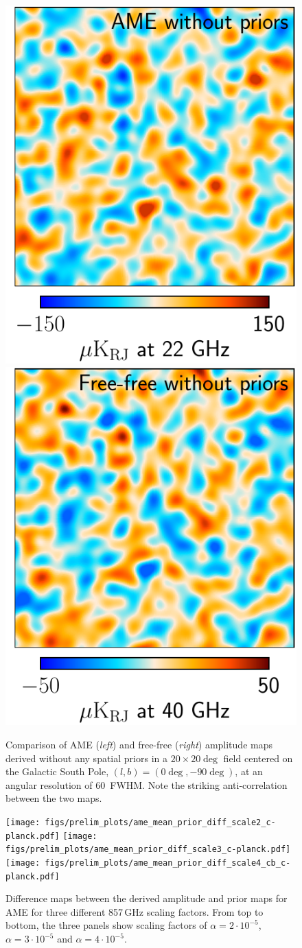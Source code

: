 \documentclass[twocolumn]{aa}
\begin{document}
\begin{figure}
  \center
  \includegraphics[width=0.49\linewidth]{figs/ame_BP8_priorfree_60arcmin_r150_lon0_lat-90_20x20deg_fs18.pdf}
  \includegraphics[width=0.49\linewidth]{figs/ff_BP8_priorfree_60arcmin_r50_lon0_lat-90_20x20deg_fs18.pdf}
  \caption{Comparison of AME (\emph{left}) and free-free
    (\emph{right}) amplitude maps derived without any spatial priors
    in a $20\times20\deg$ field centered on the Galactic South Pole,
    $(l,b)=(0\deg,-90\deg)$, at an angular resolution of
    60\arcm\ FWHM. Note the striking anti-correlation between the two maps.}
  \label{fig:amp_priors_gnom_60arcmin}
\end{figure}


\begin{figure}
  \center
  \texttt{[image: figs/prelim\_plots/ame\_mean\_prior\_diff\_scale2\_c-planck.pdf]}
  \texttt{[image: figs/prelim\_plots/ame\_mean\_prior\_diff\_scale3\_c-planck.pdf]}
  \texttt{[image: figs/prelim\_plots/ame\_mean\_prior\_diff\_scale4\_cb\_c-planck.pdf]}
  \caption{Difference maps between the derived amplitude and prior
    maps for AME for three different 857\,GHz scaling factors. From
    top to bottom, the three panels show scaling factors of
    $\alpha=2\cdot10^{-5}$, $\alpha=3\cdot10^{-5}$ and
    $\alpha=4\cdot10^{-5}$.}
  \label{fig:AME_prior_diff}
\end{figure}
\end{document}
